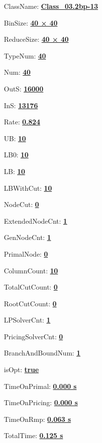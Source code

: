 \documentclass[11pt]{article}
\begin{document}
\pagestyle{empty}


ClassName: \underline{\textbf{Class_03.2bp-13}}
\par
BinSize: \underline{\textbf{40 × 40}}
\par
ReduceSize: \underline{\textbf{40 × 40}}
\par
TypeNum: \underline{\textbf{40}}
\par
Num: \underline{\textbf{40}}
\par
OutS: \underline{\textbf{16000}}
\par
InS: \underline{\textbf{13176}}
\par
Rate: \underline{\textbf{0.824}}
\par
UB: \underline{\textbf{10}}
\par
LB0: \underline{\textbf{10}}
\par
LB: \underline{\textbf{10}}
\par
LBWithCut: \underline{\textbf{10}}
\par
NodeCut: \underline{\textbf{0}}
\par
ExtendedNodeCnt: \underline{\textbf{1}}
\par
GenNodeCnt: \underline{\textbf{1}}
\par
PrimalNode: \underline{\textbf{0}}
\par
ColumnCount: \underline{\textbf{10}}
\par
TotalCutCount: \underline{\textbf{0}}
\par
RootCutCount: \underline{\textbf{0}}
\par
LPSolverCnt: \underline{\textbf{1}}
\par
PricingSolverCnt: \underline{\textbf{0}}
\par
BranchAndBoundNum: \underline{\textbf{1}}
\par
isOpt: \underline{\textbf{true}}
\par
TimeOnPrimal: \underline{\textbf{0.000 s}}
\par
TimeOnPricing: \underline{\textbf{0.000 s}}
\par
TimeOnRmp: \underline{\textbf{0.063 s}}
\par
TotalTime: \underline{\textbf{0.125 s}}
\par
\newpage


\end{document}
